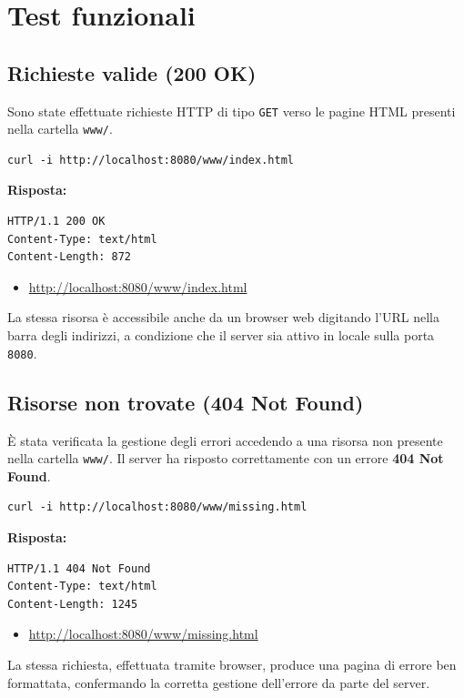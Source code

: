\documentclass[a4paper,12pt]{report}
\begin{document}
\section{Test funzionali}
\subsection{Richieste valide (200 OK)}
Sono state effettuate richieste HTTP di tipo \texttt{GET} verso le pagine HTML presenti nella cartella \texttt{www/}.

\begin{verbatim}
curl -i http://localhost:8080/www/index.html
\end{verbatim}

\textbf{Risposta:}
\begin{verbatim}
HTTP/1.1 200 OK
Content-Type: text/html
Content-Length: 872
\end{verbatim}

\begin{itemize}
    \item \url{http://localhost:8080/www/index.html}
\end{itemize}
La stessa risorsa è accessibile anche da un browser web digitando l'URL nella barra degli indirizzi, a condizione che il server sia attivo in locale sulla porta \texttt{8080}.

\newpage
\subsection{Risorse non trovate (404 Not Found)}
È stata verificata la gestione degli errori accedendo a una risorsa non presente nella cartella \texttt{www/}. Il server ha risposto correttamente con un errore \textbf{404 Not Found}.
\begin{verbatim}
curl -i http://localhost:8080/www/missing.html
\end{verbatim}

\textbf{Risposta:}
\begin{verbatim}
HTTP/1.1 404 Not Found
Content-Type: text/html
Content-Length: 1245
\end{verbatim}

\begin{itemize}
    \item \url{http://localhost:8080/www/missing.html}
\end{itemize}
La stessa richiesta, effettuata tramite browser, produce una pagina di errore ben formattata, confermando la corretta gestione dell'errore da parte del server.
\end{document}
